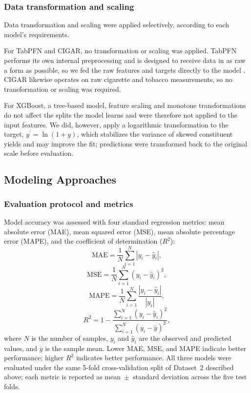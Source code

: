 ﻿\documentclass[a4paper,fleqn]{cas-sc}
\begin{document}
\subsubsection{Data transformation and scaling}

Data transformation and scaling were applied selectively, according to each model's requirements.

For TabPFN and CIGAR, no transformation or scaling was applied. TabPFN performs its
own internal preprocessing and is designed to receive data in as raw a form as
possible, so we fed the raw features and targets directly to the model \cite{priorlabs2025performance}. CIGAR likewise operates on raw cigarette and tobacco measurements, so no transformation or scaling was required.

For XGBoost, a tree-based model, feature scaling and monotone transformations
do not affect the splits the model learns and were therefore not applied to
the input features. We did, however, apply a logarithmic transformation to the
target, $y^\prime=\ln(1+y)$, which stabilizes the variance of skewed
constituent yields and may improve the fit; predictions were transformed back
to the original scale before evaluation.

\subsection{Modeling Approaches}

\subsubsection{Evaluation protocol and metrics}

Model accuracy was assessed with four standard regression metrics: mean
absolute error (MAE), mean squared error (MSE), mean absolute percentage
error (MAPE), and the coefficient of determination ($R^2$):
\[
\mathrm{MAE}=\frac{1}{N}\sum_{i=1}^{N}\left|y_i-\hat{y}_i\right|,
\]
\[
\mathrm{MSE}=\frac{1}{N}\sum_{i=1}^{N}\left(y_i-\hat{y}_i\right)^2,
\]
\[
\mathrm{MAPE}=\frac{1}{N}\sum_{i=1}^{N}\frac{\left|y_i-\hat{y}_i\right|}{\left|y_i\right|},
\]
\[
R^2=1-\frac{\sum_{i=1}^{N}\left(y_i-\hat{y}_i\right)^2}{\sum_{i=1}^{N}\left(y_i-\bar{y}\right)^2},
\]
where $N$ is the number of samples, $y_i$ and $\hat{y}_i$ are the observed
and predicted values, and $\bar{y}$ is the sample mean. Lower MAE, MSE,
and MAPE indicate better performance; higher $R^2$ indicates better
performance. All three models were evaluated under the same 5-fold
cross-validation split of Dataset~2 described above; each metric is
reported as mean~$\pm$~standard deviation across the five test folds.
\end{document}
